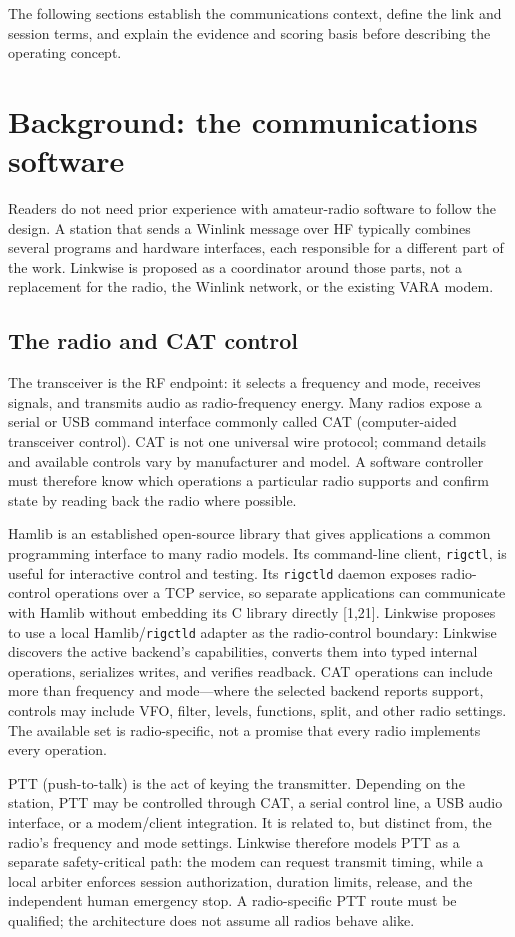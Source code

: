 \documentclass[11pt,a4paper]{article}
\begin{document}
The following sections establish the communications context, define the link and session terms, and explain the evidence and scoring basis before describing the operating concept.

\section{Background: the communications software}
Readers do not need prior experience with amateur-radio software to follow
the design. A station that sends a Winlink message over HF typically combines
several programs and hardware interfaces, each responsible for a different
part of the work. Linkwise is proposed as a coordinator around those parts,
not a replacement for the radio, the Winlink network, or the existing VARA
modem.

\subsection{The radio and CAT control}
The transceiver is the RF endpoint: it selects a frequency and mode, receives
signals, and transmits audio as radio-frequency energy. Many radios expose a
serial or USB command interface commonly called CAT (computer-aided
transceiver control). CAT is not one universal wire protocol; command details
and available controls vary by manufacturer and model. A software controller
must therefore know which operations a particular radio supports and confirm
state by reading back the radio where possible.

Hamlib is an established open-source library that gives applications a
common programming interface to many radio models. Its command-line client,
\texttt{rigctl}, is useful for interactive control and testing. Its
\texttt{rigctld} daemon exposes radio-control operations over a TCP service,
so separate applications can communicate with Hamlib without embedding its
C library directly [1,21]. Linkwise proposes to use a local Hamlib/\texttt{rigctld}
adapter as the radio-control boundary: Linkwise discovers the active backend's
capabilities, converts them into typed internal operations, serializes writes,
and verifies readback. CAT operations can include more than frequency and
mode—where the selected backend reports support, controls may include VFO,
filter, levels, functions, split, and other radio settings. The available set
is radio-specific, not a promise that every radio implements every operation.

PTT (push-to-talk) is the act of keying the transmitter. Depending on the
station, PTT may be controlled through CAT, a serial control line, a USB audio
interface, or a modem/client integration. It is related to, but distinct from,
the radio's frequency and mode settings. Linkwise therefore models PTT as a
separate safety-critical path: the modem can request transmit timing, while a
local arbiter enforces session authorization, duration limits, release, and
the independent human emergency stop. A radio-specific PTT route must be
qualified; the architecture does not assume all radios behave alike.
\end{document}
